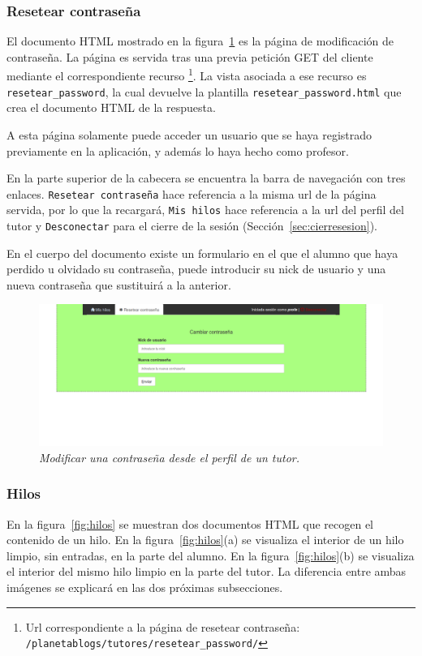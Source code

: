 \documentclass[a4paper, 12pt]{book}
\begin{document}
\subsubsection{Resetear contrase\~na} 
\label{sec:resetpass}
El documento HTML mostrado en la figura~\ref{fig:resetpass} es la p\'agina de modificaci\'on de contrase\~na. La p\'agina es servida 
tras una previa petici\'on GET del cliente mediante el correspondiente recurso \footnote{Url correspondiente a la p\'agina de resetear contrase\~na: 
\texttt{/planetablogs/tutores/resetear\_password/}}. La vista asociada a ese recurso es \texttt{resetear\_password}, la cual devuelve la plantilla 
\texttt{resetear\_password.html} que crea el documento HTML de la respuesta.

A esta p\'agina solamente puede acceder un usuario que se haya registrado previamente en la aplicaci\'on, y adem\'as lo haya hecho como profesor. 

En la parte superior de la cabecera se encuentra la barra de navegaci\'on con tres enlaces. \texttt{Resetear contrase\~na} hace referencia a la misma 
url de la p\'agina servida, por lo que la recargar\'a, \texttt{Mis hilos} hace referencia a la url del perfil del tutor y \texttt{Desconectar} para 
el cierre de la sesi\'on (Secci\'on~\ref{sec:cierresesion}).

En el cuerpo del documento existe un formulario en el que el alumno que haya perdido u olvidado su contrase\~na, puede introducir su nick de usuario y una
nueva contrase\~na que sustituir\'a a la anterior.

\begin{figure}
  \centering
  \includegraphics[width=17cm, keepaspectratio]{imagenes/ResetPass}
  \caption{\textit{Modificar una contrase\~na desde el perfil de un tutor.}}
  \label{fig:resetpass}
\end{figure}




\subsubsection{Hilos} 
\label{sec:hilos}
En la figura~\ref{fig:hilos} se muestran dos documentos HTML que recogen el contenido de un hilo. En la figura~\ref{fig:hilos}(a) se visualiza el interior
de un hilo limpio, sin entradas, en la parte del alumno. En la figura~\ref{fig:hilos}(b) se visualiza el interior del mismo hilo limpio en la parte del 
tutor. La diferencia entre ambas im\'agenes se explicar\'a en las dos pr\'oximas subsecciones.
\end{document}
